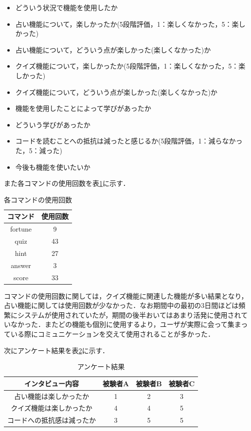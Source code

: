 \begin{itemize}
  \item どういう状況で機能を使用したか
  \item 占い機能について，楽しかったか(5段階評価，1：楽しくなかった，5：楽しかった)
  \item 占い機能について，どういう点が楽しかった(楽しくなかった)か
  \item クイズ機能について，楽しかったか(5段階評価，1：楽しくなかった，5：楽しかった)
  \item クイズ機能について，どういう点が楽しかった(楽しくなかった)か
  \item 機能を使用したことによって学びがあったか
  \item どういう学びがあったか
  \item コードを読むことへの抵抗は減ったと感じるか(5段階評価，1：減らなかった，5：減った)
  \item 今後も機能を使いたいか
\end{itemize}

また各コマンドの使用回数を表\ref{command}に示す．

\begin{table}[!h]
  \centering
  \caption{各コマンドの使用回数}
  \label{command}
    \begin{tabular}{|c|c|} \hline
      コマンド & 使用回数 \\ \hline \hline
      fortune & 9 \\ \hline
      quiz & 43 \\ \hline
      hint & 27 \\ \hline
      answer & 3 \\ \hline
      score & 33 \\ \hline
    \end{tabular}
\end{table}

コマンドの使用回数に関しては，クイズ機能に関連した機能が多い結果となり，占い機能に関しては使用回数が少なかった．なお期間中の最初の3日間ほどは頻繁にシステムが使用されていたが，期間の後半おいてはあまり活発に使用されていなかった．またどの機能も個別に使用するより，ユーザが実際に会って集まっている際にコミュニケーションを交えて使用されることが多かった．

次にアンケート結果を表\ref{interview}に示す．
\begin{table}[!b]
  \centering
  \caption{アンケート結果}
  \label{interview}
    \begin{tabular}{|c|c|c|c|} \hline
      インタビュー内容 & 被験者A & 被験者B & 被験者C \\ \hline \hline
      占い機能は楽しかったか & 1 & 2 & 3 \\ \hline
      クイズ機能は楽しかったか & 4 & 4 & 5 \\ \hline
      コードへの抵抗感は減ったか & 3 & 5 &5 \\ \hline
    \end{tabular}
\end{table}

